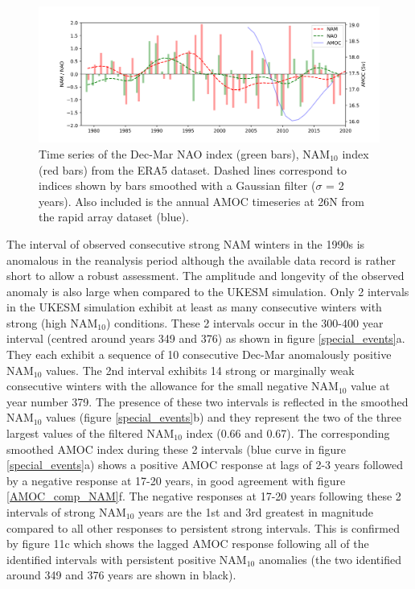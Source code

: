 \begin{figure}[h!]
\begin{center}
\noindent\includegraphics[width = 0.9\linewidth]{Figures/Figures-surface/ERA5_series_allf.png} \caption[Time series of NAO, NAM$_{10}$ and AMOC from the ERA5 and  RAPID array datasets]{Time series of the Dec-Mar NAO index (green bars), NAM$_{10}$ index (red bars) from the ERA5 dataset. Dashed lines correspond to indices shown by bars smoothed with a Gaussian filter ($\sigma$ = 2 years). Also included is the annual AMOC timeseries at 26N from the rapid array dataset (blue).}
\label{ERA5_series}
\end{center}
\end{figure}

The interval of observed consecutive strong NAM winters in the 1990s is anomalous in the reanalysis period  although the available data record is rather short to allow a robust assessment. The amplitude and longevity of the observed anomaly is also large when compared to the UKESM simulation. Only 2 intervals in the UKESM simulation exhibit at least as many consecutive winters with strong (high NAM$_{10}$) conditions. These 2 intervals occur in the 300-400 year interval (centred around years 349 and 376) as shown in figure \ref{special_events}a. They each exhibit a sequence of 10 consecutive Dec-Mar anomalously positive NAM$_{10}$ values. The 2nd interval exhibits 14 strong or marginally weak consecutive winters with the allowance for the small negative NAM$_{10}$ value at year number 379. The presence of these two intervals is reflected in the smoothed NAM$_{10}$ values (figure \ref{special_events}b) and they represent the two of the three largest values of the filtered NAM$_{10}$ index (0.66 and 0.67). The corresponding smoothed AMOC index during these 2 intervals (blue curve in figure \ref{special_events}a) shows a positive AMOC response at lags of 2-3 years followed by a negative response at 17-20 years, in good agreement with figure \ref{AMOC_comp_NAM}f. The negative responses at 17-20 years following these 2 intervals of strong NAM$_{10}$ years are the 1st and 3rd greatest in magnitude compared to all other responses to persistent strong intervals. This is confirmed by figure 11c which shows the lagged AMOC response following all of the identified intervals with persistent positive NAM$_{10}$ anomalies (the two identified around 349 and 376 years are shown in black). 

